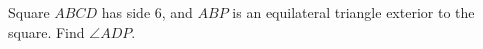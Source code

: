 Square $ABCD$ has side 6, and $ABP$ is an equilateral triangle exterior to the square. Find $\angle ADP$.
